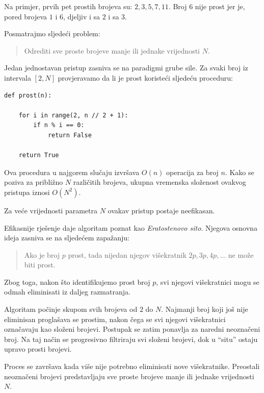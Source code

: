 Na primjer, prvih pet prostih brojeva su: $2, 3, 5, 7, 11.$ Broj $6$ nije prost jer je, pored brojeva $1$ i $6$, djeljiv i sa $2$ i sa $3$.

\medskip

Posmatrajmo sljedeći problem:
\begin{quote}
	Odrediti sve proste brojeve manje ili jednake vrijednosti $N$.
\end{quote}

Jedan jednostavan pristup zasniva se na paradigmi grube sile. Za svaki broj iz intervala $[2,N]$ provjeravamo da li je prost koristeći sljedeću proceduru:

\begin{verbatim}
def prost(n):

    for i in range(2, n // 2 + 1):
        if n % i == 0:
            return False

    return True
\end{verbatim}

Ova procedura u najgorem slučaju izvršava $O(n)$ operacija za broj $n$. Kako se poziva za približno $N$ različitih brojeva, ukupna vremenska složenost ovakvog pristupa iznosi $
O(N^2).$

Za veće vrijednosti parametra $N$ ovakav pristup postaje neefikasan.

\medskip

Efikasnije rješenje daje algoritam poznat kao \textit{Eratostenovo sito}. Njegova osnovna ideja zasniva se na sljedećem zapažanju:

\begin{quote}
	Ako je broj $p$ prost, tada nijedan njegov višekratnik
	$ 2p,3p,4p,\ldots$	ne može biti prost.
\end{quote}

Zbog toga, nakon što identifikujemo prost broj $p$, svi njegovi višekratnici mogu se odmah eliminisati iz daljeg razmatranja.

Algoritam počinje skupom svih brojeva od $2$ do $N$. Najmanji broj koji još nije eliminisan proglašava se prostim, nakon čega se svi njegovi višekratnici označavaju kao složeni brojevi. Postupak se zatim ponavlja za naredni neoznačeni broj. Na taj način se progresivno filtriraju svi složeni brojevi, dok u ``situ'' ostaju upravo prosti brojevi.

Proces se završava kada više nije potrebno eliminisati nove višekratnike. Preostali neoznačeni brojevi predstavljaju sve proste brojeve manje ili jednake vrijednosti $N$.

\medskip

